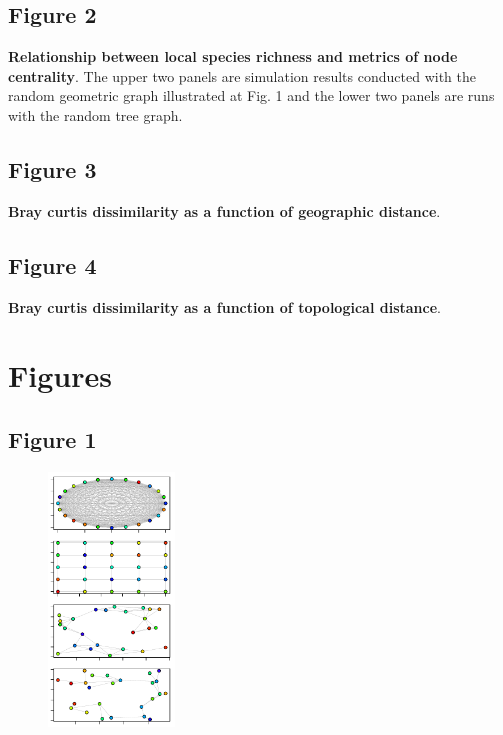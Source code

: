 \documentclass[12pt]{article}
\begin{document}
\subsection*{Figure 2}
\textbf{Relationship between local species richness and metrics of node
centrality}. The upper two panels are simulation results conducted with the
random geometric graph illustrated at Fig. 1 and the lower two panels are runs
with the random tree graph. 

\subsection*{Figure 3}
\textbf{Bray curtis dissimilarity as a function of geographic distance}. 

\subsection*{Figure 4}
\textbf{Bray curtis dissimilarity as a function of topological distance}. 

\newpage

\section*{Figures}

\subsection*{Figure 1}

\begin{figure}[ht!]
	\centering\includegraphics[width=0.3\textwidth]{Networks.pdf}
\end{figure}
\end{document}
